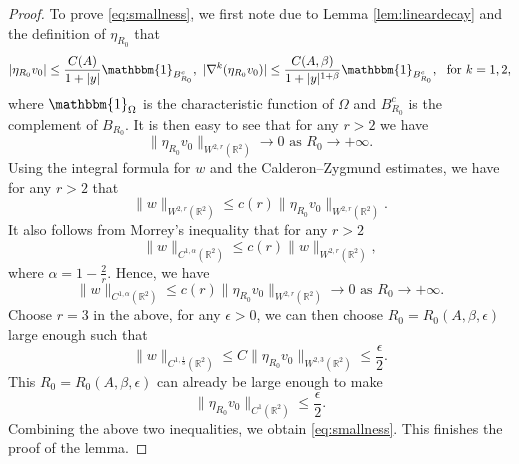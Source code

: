 \documentclass[12pt]{amsart}
\numberwithin{equation}{section}              %
\theoremstyle{remark}
\begin{document}
\begin{proof}
			To prove \eqref{eq:smallness}, we
			first note  due to Lemma \ref{lem:lineardecay} and the definition of $\eta_{R_0}$ that
			\begin{equation*}
				| \eta_{R_0}	 v_0|\leq \frac{C(A)}{1+|y|} \mathbbm{1}_{B_{R_0}^c}, ~
				|\nabla^k (\eta_{R_0}	 v_0)|\leq \frac{C(A,\beta)}{1+|y|^{1+\beta}} \mathbbm{1}_{B_{R_0}^c}, ~ \textrm{ for } k = 1, 2,
			\end{equation*}
			where $\mathbbm{1}_{\Omega}$ is the characteristic function of $\Omega$ and $B_{R_0}^c$ is the complement of $B_{R_0}$.
			It is then easy to see that  for any $r>2$ we have
			\begin{equation*}
				\| \eta_{R_0}v_0\|_{W^{2,r}(\mathbb{R}^2)} \to 0 \textrm{ as } R_0\to +\infty.
			\end{equation*}
			Using the integral formula for $w$ and the Calderon–Zygmund estimates, we have for any $r>2$ that
			\begin{equation*}
				\|w\|_{W^{2,r}(\mathbb{R}^2)}\leq c(r) \| \eta_{R_0}v_0\|_{W^{2,r}(\mathbb{R}^2)}.
			\end{equation*}
			It also follows from Morrey's inequality that for any $r>2$
			\begin{equation*}
				\|w\|_{C^{1,\alpha}(\mathbb{R}^2)}\leq c(r) \|w\|_{W^{2,r}(\mathbb{R}^2)},
			\end{equation*}
			where $\alpha = 1-\frac{2}{r}$.
			Hence, we have
			\begin{equation*}
				\|w\|_{C^{1,\alpha}(\mathbb{R}^2)}\leq 	c(r)\| \eta_{R_0}v_0\|_{W^{2,r}(\mathbb{R}^2)} \to 0 \textrm{ as } R_0\to +\infty.
			\end{equation*}
			Choose $r=3$ in the above, 
			for any $\epsilon>0$, we can then choose $R_0 = R_0(A, \beta,\epsilon)$ large enough such that
			\begin{equation*}
				\|w\|_{C^{1,\frac{1}{3}}(\mathbb{R}^2)}\leq C \| \eta_{R_0}v_0\|_{W^{2,3}(\mathbb{R}^2)}\leq  \frac{\epsilon}{2}.
			\end{equation*}
			This $R_0 = R_0(A, \beta,\epsilon)$ can already be large enough to make 
			\begin{equation*}
				\|\eta_{R_0}	 v_0\|_{C^{1}(\mathbb{R}^2)} \leq\frac{\epsilon}{2}.
			\end{equation*}
			Combining the above two inequalities, we obtain  \eqref{eq:smallness}. 
			This finishes the  proof of the lemma.
		\end{proof}
		
\end{document}
